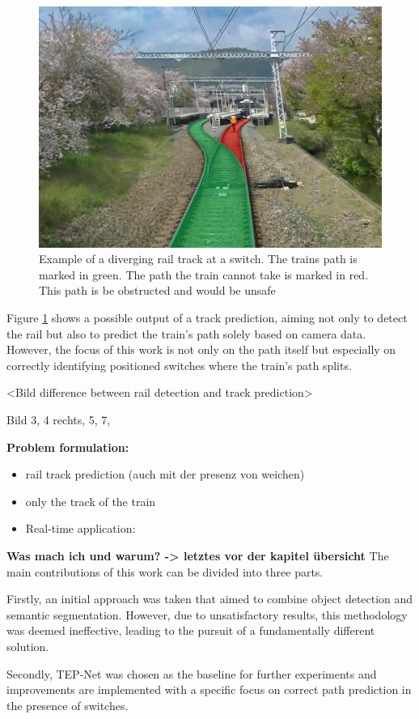 \begin{figure}[H]
    \centering
    \includegraphics[width=0.5\linewidth]{PICs/Introduction/train-ego-path.png}
    \caption{Example of a diverging rail track at a switch. The trains path is marked in green. The path the train cannot take is marked in red. This path is be obstructed and would be unsafe \cite{tepNet2024}}
    \label{fig:train-ego-path}
\end{figure}

Figure \ref{fig:train-ego-path} shows a possible output of a track prediction, aiming not only to detect the rail but also to predict the train's path solely based on camera data.
However, the focus of this work is not only on the path itself but especially on correctly identifying positioned switches where the train's path splits.

<Bild difference between rail detection and track prediction>

Bild 3, 4 rechts, 5, 7, 

\textbf{Problem formulation:}
\begin{itemize}
    \item rail track prediction (auch mit der presenz von weichen)
    \item only the track of the train
    \item Real-time application: 
\end{itemize}

\textbf{Was mach ich und warum? -> letztes vor der kapitel übersicht}
The main contributions of this work can be divided into three parts.

Firstly, an initial approach was taken that aimed to combine object detection and semantic segmentation.
However, due to unsatisfactory results, this methodology was deemed ineffective, leading to the pursuit of a fundamentally different solution.

Secondly, TEP-Net \cite{tepNet2024} was chosen as the baseline for further experiments and improvements are implemented with a specific focus on correct path prediction in the presence of switches.

